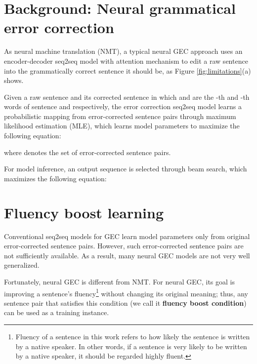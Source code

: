 \documentclass{article} \usepackage{MSRA_TR,times}
\begin{document}
\section{Background: Neural grammatical error correction}\label{sec:background}

As neural machine translation (NMT), a typical neural GEC approach uses an encoder-decoder seq2seq model \citep{DBLP:journals/corr/SutskeverVL14,cho-EtAl:2014:EMNLP2014} with attention mechanism \citep{DBLP:journals/corr/BahdanauCB14} to edit a raw sentence into the grammatically correct sentence it should be, as Figure \ref{fig:limitations}(a) shows.

Given a raw sentence  and its corrected sentence  in which  and  are the -th and -th words of sentence  and  respectively, the error correction seq2seq model learns a probabilistic mapping  from error-corrected sentence pairs through maximum likelihood estimation (MLE), which learns model parameters  to maximize the following equation: 



where  denotes the set of error-corrected sentence pairs.





For model inference, an output sequence  is selected through beam search, which maximizes the following equation:












\section{Fluency boost learning}\label{sec:learning}


Conventional seq2seq models for GEC learn model parameters only from original error-corrected sentence pairs.
However, such error-corrected sentence pairs are not sufficiently available. As a result, many neural GEC models are not very well generalized.

Fortunately, neural GEC is different from NMT. For neural GEC, its goal is improving a sentence's fluency\footnote{Fluency of a sentence in this work refers to how likely the sentence is written by a native speaker. In other words, if a sentence is very likely to be written by a native speaker, it should be regarded highly fluent.} without changing its original meaning; thus, any sentence pair that satisfies this condition (we call it \textbf{fluency boost condition}) can be used as a training instance.
\end{document}
